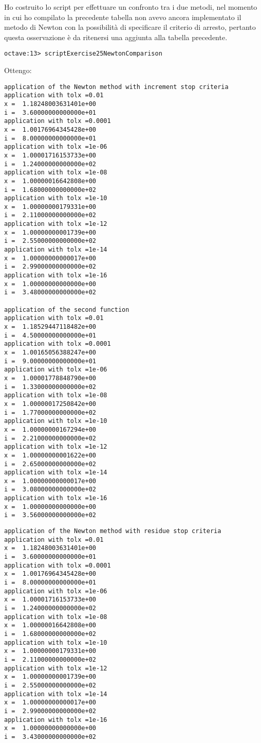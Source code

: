 \newpage
\begin{oss}
Ho costruito lo script 
per effettuare un confronto tra i due metodi, nel momento in cui ho compilato la
precedente tabella non avevo ancora implementato il metodo di Newton con la
possibilit\`a di specificare il criterio di arresto, pertanto questa
osservazione \`e da ritenersi una aggiunta alla tabella precedente.
\begin{lstlisting}
octave:13> scriptExercise25NewtonComparison
\end{lstlisting}
Ottengo:	
\begin{multicols}{2}	
\begin{lstlisting}
application of the Newton method with increment stop criteria
application with tolx =0.01
x =  1.18248003631401e+00
i =  3.60000000000000e+01
application with tolx =0.0001
x =  1.00176964345428e+00
i =  8.00000000000000e+01
application with tolx =1e-06
x =  1.00001716153733e+00
i =  1.24000000000000e+02
application with tolx =1e-08
x =  1.00000016642808e+00
i =  1.68000000000000e+02
application with tolx =1e-10
x =  1.00000000179331e+00
i =  2.11000000000000e+02
application with tolx =1e-12
x =  1.00000000001739e+00
i =  2.55000000000000e+02
application with tolx =1e-14
x =  1.00000000000017e+00
i =  2.99000000000000e+02
application with tolx =1e-16
x =  1.00000000000000e+00
i =  3.48000000000000e+02

application of the second function
application with tolx =0.01
x =  1.18529447118482e+00
i =  4.50000000000000e+01
application with tolx =0.0001
x =  1.00165056388247e+00
i =  9.00000000000000e+01
application with tolx =1e-06
x =  1.00001778848790e+00
i =  1.33000000000000e+02
application with tolx =1e-08
x =  1.00000017250842e+00
i =  1.77000000000000e+02
application with tolx =1e-10
x =  1.00000000167294e+00
i =  2.21000000000000e+02
application with tolx =1e-12
x =  1.00000000001622e+00
i =  2.65000000000000e+02
application with tolx =1e-14
x =  1.00000000000017e+00
i =  3.08000000000000e+02
application with tolx =1e-16
x =  1.00000000000000e+00
i =  3.56000000000000e+02
\end{lstlisting}
\columnbreak
\begin{lstlisting}
application of the Newton method with residue stop criteria
application with tolx =0.01
x =  1.18248003631401e+00
i =  3.60000000000000e+01
application with tolx =0.0001
x =  1.00176964345428e+00
i =  8.00000000000000e+01
application with tolx =1e-06
x =  1.00001716153733e+00
i =  1.24000000000000e+02
application with tolx =1e-08
x =  1.00000016642808e+00
i =  1.68000000000000e+02
application with tolx =1e-10
x =  1.00000000179331e+00
i =  2.11000000000000e+02
application with tolx =1e-12
x =  1.00000000001739e+00
i =  2.55000000000000e+02
application with tolx =1e-14
x =  1.00000000000017e+00
i =  2.99000000000000e+02
application with tolx =1e-16
x =  1.00000000000000e+00
i =  3.43000000000000e+02


\end{lstlisting}
\end{multicols}
\end{oss}
